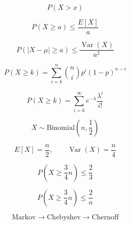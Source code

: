 \documentclass[12pt]{article}
\begin{document}
\[
P(X>x)
\]

\[
P(X\ge a)\le \frac{E[X]}{a}
\]

\[
P(|X-\mu|\ge a)\le \frac{\operatorname{Var}(X)}{a^2}
\]

\[
P(X\ge k)=\sum_{i=k}^{n}\binom{n}{i}p^i(1-p)^{n-i}
\]

\[
P(X\ge k)=\sum_{i=k}^{\infty} e^{-\lambda}\frac{\lambda^i}{i!}
\]

\[
X\sim \text{Binomial}\left(n,\frac12\right)
\]

\[
E[X]=\frac n2,\qquad \operatorname{Var}(X)=\frac n4
\]

\[
P\left(X\ge \frac34 n\right)\le \frac23
\]

\[
P\left(X\ge \frac34 n\right)\le \frac2n
\]

\[
\text{Markov} \rightarrow \text{Chebyshev} \rightarrow \text{Chernoff}
\]
\end{document}
